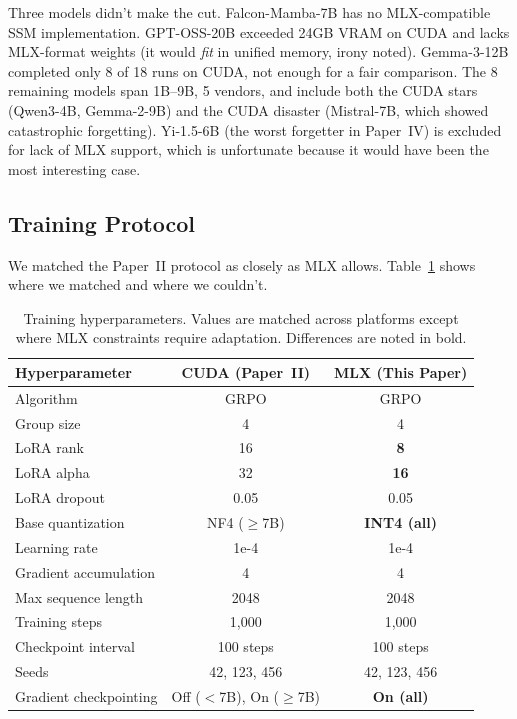 \documentclass[11pt]{article}
\begin{document}
Three models didn't make the cut.  Falcon-Mamba-7B has no MLX-compatible SSM implementation.  GPT-OSS-20B exceeded 24GB VRAM on CUDA and lacks MLX-format weights (it would \emph{fit} in unified memory, irony noted).  Gemma-3-12B completed only 8 of 18 runs on CUDA, not enough for a fair comparison.  The 8 remaining models span 1B--9B, 5 vendors, and include both the CUDA stars (Qwen3-4B, Gemma-2-9B) and the CUDA disaster (Mistral-7B, which showed catastrophic forgetting).  Yi-1.5-6B (the worst forgetter in Paper~IV) is excluded for lack of MLX support, which is unfortunate because it would have been the most interesting case.

\subsection{Training Protocol}

We matched the Paper~II protocol as closely as MLX allows.  Table~\ref{tab:hyperparams} shows where we matched and where we couldn't.

\begin{table}[t]
\centering
\caption{Training hyperparameters.  Values are matched across platforms except where MLX constraints require adaptation.  Differences are noted in bold.}
\label{tab:hyperparams}
\begin{tabular}{l c c}
\toprule
\textbf{Hyperparameter} & \textbf{CUDA (Paper~II)} & \textbf{MLX (This Paper)} \\
\midrule
Algorithm & GRPO & GRPO \\
Group size & 4 & 4 \\
LoRA rank & 16 & \textbf{8} \\
LoRA alpha & 32 & \textbf{16} \\
LoRA dropout & 0.05 & 0.05 \\
Base quantization & NF4 ($\geq$7B) & \textbf{INT4 (all)} \\
Learning rate & 1e-4 & 1e-4 \\
Gradient accumulation & 4 & 4 \\
Max sequence length & 2048 & 2048 \\
Training steps & 1{,}000 & 1{,}000 \\
Checkpoint interval & 100 steps & 100 steps \\
Seeds & 42, 123, 456 & 42, 123, 456 \\
Gradient checkpointing & Off ($<$7B), On ($\geq$7B) & \textbf{On (all)} \\
\bottomrule
\end{tabular}
\end{table}
\end{document}
